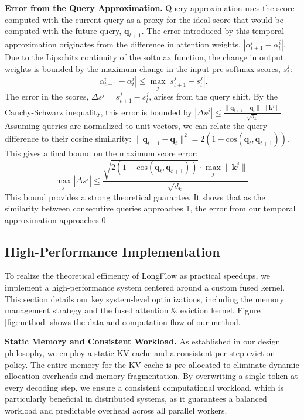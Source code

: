 \noindent\textbf{Error from the Query Approximation.}
Query approximation uses the score computed with the current query as a proxy for the ideal score that would be computed with the future query, \( \mathbf{q}_{t+1} \). The error introduced by this temporal approximation originates from the difference in attention weights, \( |\alpha_{t+1}^i - \alpha_t^i| \).
Due to the Lipschitz continuity of the softmax function, the change in output weights is bounded by the maximum change in the input pre-softmax scores, \(s_t^j\):
\begin{equation}
|\alpha_{t+1}^i - \alpha_t^i| \le \max_j |s_{t+1}^j - s_t^j|.
\end{equation}
The error in the scores, \( \Delta s^j = s_{t+1}^j - s_t^j \), arises from the query shift. By the Cauchy-Schwarz inequality, this error is bounded by \( |\Delta s^j| \le \frac{\|\mathbf{q}_{t+1} - \mathbf{q}_t\| \cdot \|\mathbf{k}^j\|}{\sqrt{d_k}} \). Assuming queries are normalized to unit vectors, we can relate the query difference to their cosine similarity: \( \|\mathbf{q}_{t+1} - \mathbf{q}_t\|^2 = 2(1 - \text{cos}(\mathbf{q}_t, \mathbf{q}_{t+1})) \). This gives a final bound on the maximum score error:
\begin{equation}
\label{eq:score_error_bound_final}
\max_j |\Delta s^j| \le \frac{\sqrt{2(1 - \text{cos}(\mathbf{q}_t, \mathbf{q}_{t+1}))} \cdot \max_j\|\mathbf{k}^j\|}{\sqrt{d_k}}.
\end{equation}
This bound provides a strong theoretical guarantee. It shows that as the similarity between consecutive queries approaches 1, the error from our temporal approximation approaches 0.


%
%
%
%
%
%
%
%
%
%
\subsection{High-Performance Implementation}



To realize the theoretical efficiency of LongFlow as practical speedups, we implement a high-performance system centered around a custom fused kernel.
This section details our key system-level optimizations, including the memory management strategy and the fused attention \& eviction kernel. Figure \ref{fig:method} shows the data and computation flow of our method.

\noindent\textbf{Static Memory and Consistent Workload.}
As established in our design philosophy, we employ a static KV cache and a consistent per-step eviction policy. The entire memory for the KV cache is pre-allocated to eliminate dynamic allocation overheads and memory fragmentation. By overwriting a single token at every decoding step, we ensure a consistent computational workload, which is particularly beneficial in distributed systems, as it guarantees a balanced workload and predictable overhead across all parallel workers.

